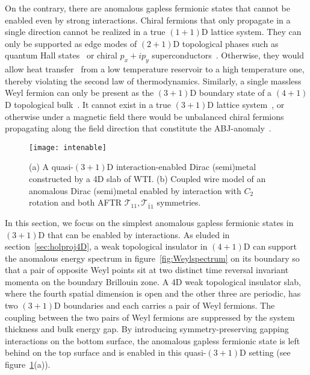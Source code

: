 On the contrary, there are anomalous gapless fermionic states that cannot be enabled even by strong interactions. Chiral fermions that only propagate in a single direction cannot be realized in a true $(1+1)$D lattice system. They can only be supported as edge modes of $(2+1)$D topological phases such as quantum Hall states~\cite{Wenedgereview} or chiral $p_x+ip_y$ superconductors~\cite{Volovik99,ReadGreen}. Otherwise, they would allow heat transfer~\cite{KaneFisher97,Cappelli01,Kitaev06} from a low temperature reservoir to a high temperature one, thereby violating the second law of thermodynamics. Similarly, a single massless Weyl fermion can only be present as the $(3+1)$D boundary state of a $(4+1)$D topological bulk~\cite{ZhangHu01,BernevigChernHuToumbasZhang02,QiHughesZhang08,SchnyderRyuFurusakiLudwig08,Kitaevtable08}. It cannot exist in a true $(3+1)$D lattice system~\cite{Nielsen_Ninomiya_1981,NielsenNinomiyaPLB1981}, or otherwise under a magnetic field there would be unbalanced chiral fermions propagating along the field direction that constitute the ABJ-anomaly~\cite{Adler69,BellJackiw69,NielsenNinomiya83}.

\begin{figure}[htbp]
\centering\texttt{[image: intenable]}
\caption{(a) A quasi-$(3+1)$D interaction-enabled Dirac (semi)metal constructed by a 4D slab of WTI. (b) Coupled wire model of an anomalous Dirac (semi)metal enabled by interaction with $C_2$ rotation and both AFTR $\mathcal{T}_{11},\mathcal{T}_{\bar{1}1}$ symmetries.}\label{fig:intenable}
\end{figure}

In this section, we focus on the simplest anomalous gapless fermionic states in $(3+1)$D that can be enabled by interactions. As eluded in section~\ref{sec:holproj4D}, a weak topological insulator in $(4+1)$D can support the anomalous energy spectrum in figure~\ref{fig:Weylspectrum} on its boundary so that a pair of opposite Weyl points sit at two distinct time reversal invariant momenta on the boundary Brillouin zone. A 4D weak topological insulator slab, where the fourth spatial dimension is open and the other three are periodic, has two $(3+1)$D boundaries and each carries a pair of Weyl fermions. The coupling between the two pairs of Weyl fermions are suppressed by the system thickness and bulk energy gap. By introducing symmetry-preserving gapping interactions on the bottom surface, the anomalous gapless fermionic state is left behind on the top surface and is enabled in this quasi-$(3+1)$D setting (see figure~\ref{fig:intenable}(a)).

